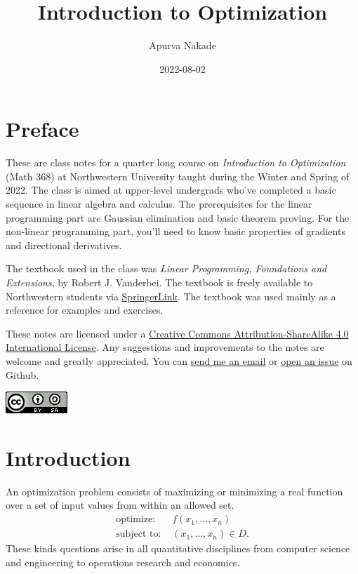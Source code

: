 \documentclass[
]{book}
\title{Introduction to Optimization}
\author{Apurva Nakade}
\date{2022-08-02}
\theoremstyle{definition}
\theoremstyle{definition}
\theoremstyle{definition}
\theoremstyle{definition}
\theoremstyle{remark}
\begin{document}
\maketitle

\thispagestyle{empty}

{
\setcounter{tocdepth}{2}
\tableofcontents
}
\hypertarget{preface}{%
\chapter*{Preface}\label{preface}}


These are class notes for a quarter long course on \emph{Introduction to Optimization} (Math 368) at Northwestern University taught during the Winter and Spring of 2022. The class is aimed at upper-level undergrads who've completed a basic sequence in linear algebra and calculus. The prerequisites for the linear programming part are Gaussian elimination and basic theorem proving. For the non-linear programming part, you'll need to know basic properties of gradients and directional derivatives.

The textbook used in the class was \emph{Linear Programming, Foundations and Extensions}, by Robert J. Vanderbei. The textbook is freely available to Northwestern students via \href{https://link.springer.com/book/10.1007/978-1-4614-7630-6}{SpringerLink}. The textbook was used mainly as a reference for examples and exercises.

These notes are licensed under a \href{\%5Bhttp://creativecommons.org/licenses/by-sa/4.0/\%5D(http://creativecommons.org/licenses/by-sa/4.0/)}{Creative Commons Attribution-ShareAlike 4.0 International License}.
Any suggestions and improvements to the notes are welcome and greatly appreciated.
You can \href{mailto:apurva.nakade@northwestern.edu}{send me an email} or \href{https://github.com/apurvanakade/Introduction-to-Optimization/issues}{open an issue} on Github.

\includegraphics{images/cc-by-sa-4.png}

\hypertarget{introduction}{%
\chapter{Introduction}\label{introduction}}

An optimization problem consists of maximizing or minimizing a real function over a set of input values from within an allowed set.
\begin{align*}
\mbox{optimize: } & f(x_1, \dots, x_n) \\
\mbox{subject to: } & (x_1, \dots, x_n) \in D.
\end{align*}
These kinds questions arise in all quantitative disciplines from computer science and engineering to operations research and economics.
\end{document}
